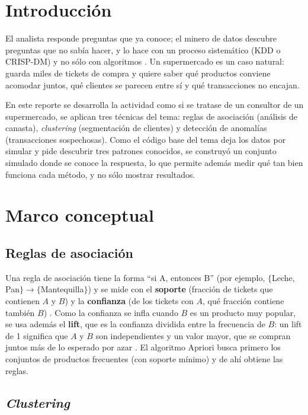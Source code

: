 \documentclass[11pt,letterpaper]{article}
\begin{document}
\portada
\indicegeneral

\section{Introducción}

El analista responde preguntas que ya conoce; el minero de datos descubre preguntas que no sabía hacer, y lo hace con un proceso sistemático (KDD o CRISP-DM) y no sólo con algoritmos \parencite{iae_u4_t45}. Un supermercado es un caso natural: guarda miles de tickets de compra y quiere saber qué productos conviene acomodar juntos, qué clientes se parecen entre sí y qué transacciones no encajan.

En este reporte se desarrolla la actividad como si se tratase de un consultor de un supermercado, se aplican tres técnicas del tema: reglas de asociación (análisis de canasta), \textit{clustering} (segmentación de clientes) y detección de anomalías (transacciones sospechosas). Como el código base del tema deja los datos por simular y pide descubrir tres patrones conocidos, se construyó un conjunto simulado donde se conoce la respuesta, lo que permite además medir qué tan bien funciona cada método, y no sólo mostrar resultados.

\section{Marco conceptual}

\subsection{Reglas de asociación}

Una regla de asociación tiene la forma ``si A, entonces B'' (por ejemplo, $\{$Leche, Pan$\} \rightarrow \{$Mantequilla$\}$) y se mide con el \textbf{soporte} (fracción de tickets que contienen $A$ y $B$) y la \textbf{confianza} (de los tickets con $A$, qué fracción contiene también $B$) \parencite{iae_u4_t45}. Como la confianza se infla cuando $B$ es un producto muy popular, se usa además el \textbf{lift}, que es la confianza dividida entre la frecuencia de $B$: un lift de 1 significa que $A$ y $B$ son independientes y un valor mayor, que se compran juntos más de lo esperado por azar \parencite{han2011}. El algoritmo Apriori busca primero los conjuntos de productos frecuentes (con soporte mínimo) y de ahí obtiene las reglas.

\subsection{\textit{Clustering}}
\end{document}
